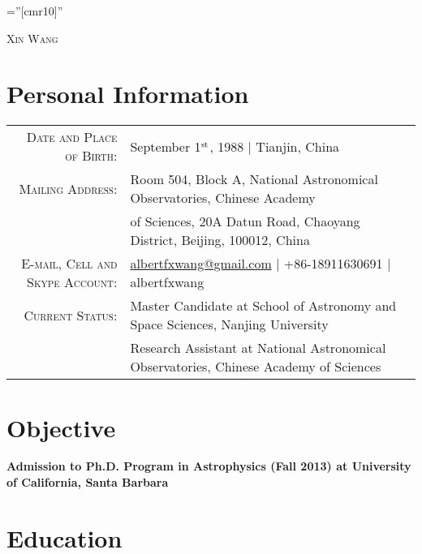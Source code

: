 \documentclass[10pt]{article}
\begin{document}
\pagestyle{empty}    %
\font\fb=''[cmr10]'' %

\par{\centering
  {\huge \textsc{Xin Wang}}
\par}
\vspace{-1em}

\section{Personal Information}

\begin{tabular}{rl}
    \textsc{Date and Place of Birth:}       & September 1$^{\rm st}$, 1988  |  Tianjin, China \\
    \textsc{Mailing Address:} & Room 504, Block A, National Astronomical Observatories, Chinese Academy\\
                              & of Sciences, 20A Datun Road, Chaoyang District, Beijing, 100012, China \\
    \textsc{E-mail, Cell and Skype Account:}  & \href{mailto:albertfxwang@gmail.com}{albertfxwang@gmail.com}  |  +86-18911630691  |  albertfxwang \\
    \textsc{Current Status:}
& Master Candidate at School of Astronomy and Space Sciences, Nanjing University  \\
& Research Assistant at National Astronomical Observatories, Chinese Academy of Sciences  \\
\end{tabular}

\vspace{-0.5cm}
\section{Objective}
\textbf{Admission to Ph.D. Program in Astrophysics (Fall 2013) at University of California, Santa Barbara}

\section{Education}
\end{document}
